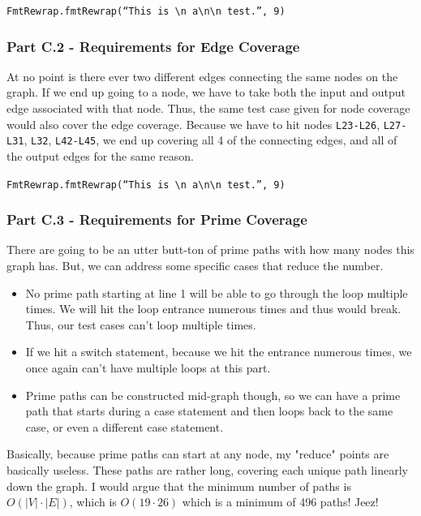 \documentclass{article}
\begin{document}
\texttt{FmtRewrap.fmtRewrap(``This is \textbackslash n a\textbackslash n\textbackslash n test.'', 9)}

\subsubsection*{Part C.2 - Requirements for Edge Coverage}

At no point is there ever two different edges connecting the same nodes on the graph. If we end up going to a node, we have to take both the input and output edge associated with that node. Thus, the same test case given for node coverage would also cover the edge coverage. Because we have to hit nodes \texttt{L23-L26}, \texttt{L27-L31}, \texttt{L32}, \texttt{L42-L45}, we end up covering all 4 of the connecting edges, and all of the output edges for the same reason.

\texttt{FmtRewrap.fmtRewrap(``This is \textbackslash n a\textbackslash n\textbackslash n test.'', 9)}

\subsubsection*{Part C.3 - Requirements for Prime Coverage}

There are going to be an utter butt-ton of prime paths with how many nodes this graph has. But, we can address some specific cases that reduce the number.

\begin{itemize}
    \item No prime path starting at line 1 will be able to go through the loop multiple times. We will hit the loop entrance numerous times and thus would break. Thus, our test cases can't loop multiple times.
    \item If we hit a switch statement, because we hit the entrance numerous times, we once again can't have multiple loops at this part.
    \item Prime paths can be constructed mid-graph though, so we can have a prime path that starts during a case statement and then loops back to the same case, or even a different case statement.
\end{itemize}

Basically, because prime paths can start at any node, my "reduce" points are basically useless. These paths are rather long, covering each unique path linearly down the graph. I would argue that the minimum number of paths is $O(|V| \cdot |E|)$, which is $O(19 \cdot 26)$ which is a minimum of 496 paths! Jeez!
\end{document}
